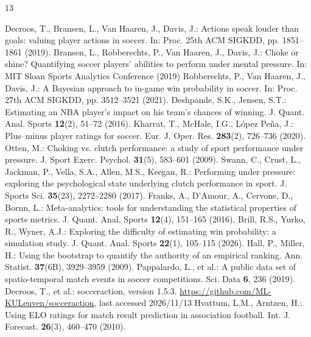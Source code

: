 \documentclass[runningheads]{llncs}
\begin{document}
\begin{thebibliography}{13}
\raggedright
{} Decroos, T., Bransen, L., Van Haaren, J., Davis, J.: Actions speak louder than goals: valuing player actions in soccer. In: Proc. 25th ACM SIGKDD, pp. 1851--1861 (2019). 
 Bransen, L., Robberechts, P., Van Haaren, J., Davis, J.: Choke or shine? Quantifying soccer players' abilities to perform under mental pressure. In: MIT Sloan Sports Analytics Conference (2019)
 Robberechts, P., Van Haaren, J., Davis, J.: A Bayesian approach to in-game win probability in soccer. In: Proc. 27th ACM SIGKDD, pp. 3512--3521 (2021). 
 Deshpande, S.K., Jensen, S.T.: Estimating an NBA player's impact on his team's chances of winning. J. Quant. Anal. Sports \textbf{12}(2), 51--72 (2016). 
 Kharrat, T., McHale, I.G., L\'opez Pe\~na, J.: Plus--minus player ratings for soccer. Eur. J. Oper. Res. \textbf{283}(2), 726--736 (2020). 
 Otten, M.: Choking vs. clutch performance: a study of sport performance under pressure. J. Sport Exerc. Psychol. \textbf{31}(5), 583--601 (2009). 
 Swann, C., Crust, L., Jackman, P., Vella, S.A., Allen, M.S., Keegan, R.: Performing under pressure: exploring the psychological state underlying clutch performance in sport. J. Sports Sci. \textbf{35}(23), 2272--2280 (2017). 
 Franks, A., D'Amour, A., Cervone, D., Bornn, L.: Meta-analytics: tools for understanding the statistical properties of sports metrics. J. Quant. Anal. Sports \textbf{12}(4), 151--165 (2016). 
 Brill, R.S., Yurko, R., Wyner, A.J.: Exploring the difficulty of estimating win probability: a simulation study. J. Quant. Anal. Sports \textbf{22}(1), 105--115 (2026). 
 Hall, P., Miller, H.: Using the bootstrap to quantify the authority of an empirical ranking. Ann. Statist. \textbf{37}(6B), 3929--3959 (2009). 
 Pappalardo, L., et al.: A public data set of spatio-temporal match events in soccer competitions. Sci. Data \textbf{6}, 236 (2019). 
 Decroos, T., et al.: socceraction, version 1.5.3. \url{https://github.com/ML-KULeuven/socceraction}, last accessed 2026/11/13
 Hvattum, L.M., Arntzen, H.: Using ELO ratings for match result prediction in association football. Int. J. Forecast. \textbf{26}(3), 460--470 (2010). 
\end{thebibliography}
\end{document}
